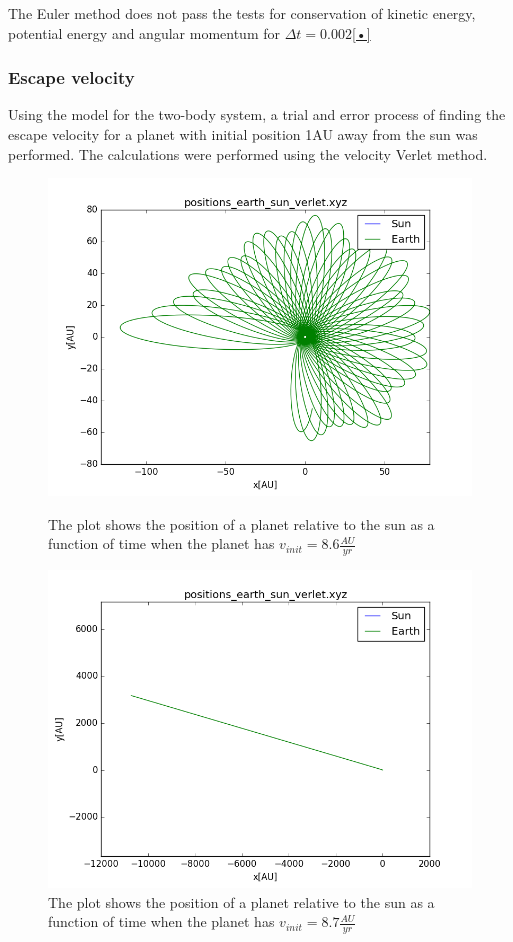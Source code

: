 The Euler method does not pass the tests for conservation of kinetic energy, potential energy and angular momentum for $\Delta t = 0.002$\ref{•}

\subsubsection{Escape velocity}\label{results:escape-velocity}
Using the model for the two-body system, a trial and error process of finding the escape velocity
for a planet with initial position 1AU away from the sun was performed. The calculations were
performed using the velocity Verlet method.
\begin{figure}[h]
\includegraphics[width=\textwidth]{figures/escape_86}
\label{tab:comp-time}
\caption{The plot shows the position of a planet relative to the sun as a function of time when 
the planet has $v_{init} = 8.6\tfrac{AU}{yr}$}
\end{figure}
\begin{figure}[h]
\includegraphics[width=\textwidth]{figures/escape_87}
\caption{The plot shows the position of a planet relative to the sun as a function of time when 
the planet has $v_{init} = 8.7\tfrac{AU}{yr}$}
\end{figure}

